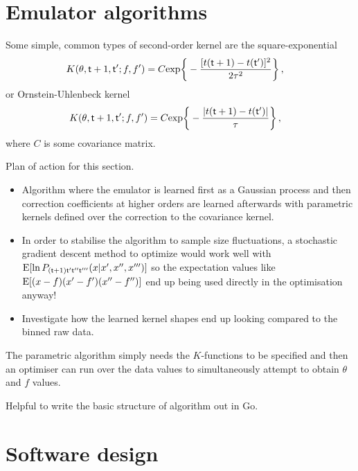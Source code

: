 \section{\sffamily Emulator algorithms}

Some simple, common types of second-order kernel are the square-exponential
\begin{align}
K(\theta , {\sf t}+1, {\sf t}'; f, f') &= C {\rm exp}\bigg\{ -\frac{[t({\sf t}+1)-t({\sf t}')]^2}{2\tau^2}\bigg\} \,, 
\end{align}
or Ornstein-Uhlenbeck kernel
\begin{align}
K(\theta , {\sf t}+1, {\sf t}'; f, f') &= C {\rm exp}\bigg\{ -\frac{\vert t({\sf t}+1)-t({\sf t}')\vert}{\tau}\bigg\} \,,
\end{align}
where $C$ is some covariance matrix.



Plan of action for this section.
\begin{itemize}
\item{Algorithm where the emulator is learned first as a Gaussian process and then correction coefficients at higher orders are learned afterwards with parametric kernels defined over the correction to the covariance kernel.}
\item{In order to stabilise the algorithm to sample size fluctuations, a stochastic gradient descent method to optimize would work well with ${\rm E}[\ln P_{({\sf t}+1){\sf t}'{\sf t}''{\sf t}'''}(x\vert x', x'', x''')]$ so the expectation values like ${\rm E}[(x-f)(x'-f')(x''-f'')]$ end up being used directly in the optimisation anyway!}
\item{Investigate how the learned kernel shapes end up looking compared to the binned raw data.}
\end{itemize}

The parametric algorithm simply needs the $K$-functions to be specified and then an optimiser can run over the data values to simultaneously attempt to obtain $\theta$ and $f$ values. 

Helpful to write the basic structure of algorithm out in Go.

\section{\sffamily Software design}

